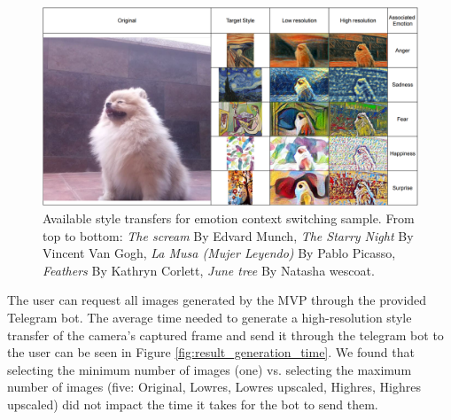 \begin{figure}[h]
    \centering
    \includegraphics[width = \textwidth]{resources/styletransfer_emogrid.png}
    \caption{Available style transfers for emotion context switching sample. From top to bottom:
        \emph{The scream} By Edvard Munch,
        \emph{The Starry Night} By Vincent Van Gogh,
        \emph{La Musa (Mujer Leyendo)} By Pablo Picasso,
        \emph{Feathers} By Kathryn Corlett,
        \emph{June tree} By Natasha wescoat.
    } \label{fig:style_results_grid}
\end{figure}

The user can request all images generated by the MVP through the provided Telegram bot. The average time needed to generate a high-resolution style transfer of the camera's captured frame and send it through the telegram bot to the user can be seen in Figure \ref{fig:result_generation_time}. We found that selecting the minimum number of images (one) vs. selecting the maximum number of images (five: Original, Lowres, Lowres upscaled, Highres, Highres upscaled) did not impact the time it takes for the bot to send them.